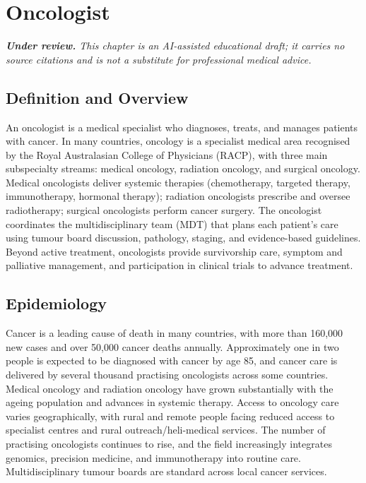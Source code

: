 \chapter{Oncologist}

\medskip
\noindent\textit{\textbf{Under review.} This chapter is an AI-assisted educational draft; it carries no source citations and is not a substitute for professional medical advice.}

\section*{Definition and Overview}
An oncologist is a medical specialist who diagnoses, treats, and manages patients with cancer. In many countries, oncology is a specialist medical area recognised by the Royal Australasian College of Physicians (RACP), with three main subspecialty streams: medical oncology, radiation oncology, and surgical oncology. Medical oncologists deliver systemic therapies (chemotherapy, targeted therapy, immunotherapy, hormonal therapy); radiation oncologists prescribe and oversee radiotherapy; surgical oncologists perform cancer surgery. The oncologist coordinates the multidisciplinary team (MDT) that plans each patient's care using tumour board discussion, pathology, staging, and evidence-based guidelines. Beyond active treatment, oncologists provide survivorship care, symptom and palliative management, and participation in clinical trials to advance treatment.

\section*{Epidemiology}
Cancer is a leading cause of death in many countries, with more than 160,000 new cases and over 50,000 cancer deaths annually. Approximately one in two people is expected to be diagnosed with cancer by age 85, and cancer care is delivered by several thousand practising oncologists across some countries. Medical oncology and radiation oncology have grown substantially with the ageing population and advances in systemic therapy. Access to oncology care varies geographically, with rural and remote people facing reduced access to specialist centres and rural outreach/heli-medical services. The number of practising oncologists continues to rise, and the field increasingly integrates genomics, precision medicine, and immunotherapy into routine care. Multidisciplinary tumour boards are standard across local cancer services.

